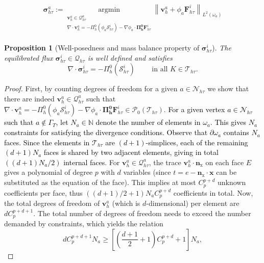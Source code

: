 \documentclass[10pt,a4paper]{amsart}
\newtheorem{proposition}{Proposition}
\def \Fhti {\bm{F}_\htt^i}
\def \Shti {\calS_\htt^i}
\def \calN {\mathcal{N}}
\def \calP {\mathcal{P}}
\def \calQ {\bm{\mathcal{Q}}}
\def \calS {\mathcal{S}}
\def \calT {\mathcal{T}}
\def \flx {\bm{\sigma}_{\htt}^i}
\def \flxa {\bm{\sigma}^a_{\htt}}
\def \htt {{h\tau}}
\def \nhat {\bm{n}_{\mathrm{x}}}
\def \oma {\omega_a}
\def \p  {\partial}
\def \x {{\bm{x}}}
\begin{document}
    \begin{align}\label{eq:optimization}
        \flxa:= \underset{\substack{\bm{v}^a_h\in\calQ_\htt^a\\
       \nabla\cdot \bm{v}^a_h = -\Pi_h^0 (\phi_a \Shti) - \nabla\phi_a \cdot \bm{\Pi_h^0} \Fhti}}{\mathrm{argmin}} \left\| \bm{v}^a_h + \phi_a \Fhti\right\|_{L^2(\oma)}
    \end{align}

\begin{proposition}[Well-posedness and mass balance property of $\flx$]\label{mass_balance_property}
    The equilibrated flux $\flx \in \calQ_\htt$ is well defined and satisfies 
    \[
    \nabla\cdot \flx= -\Pi_h^0(\Shti) \qquad \text{ in all } K\in \calT_\htt.
    \]
\end{proposition}

\begin{proof}
First, by counting degrees of freedom for a given $a\in \calN_\htt$ we show that there are indeed $\bm{v}_h^a\in \calQ_\htt^a $ such that $\nabla\cdot \bm{v}^a_h = -\Pi_h^0 (\phi_a \Shti) - \nabla\phi_a \cdot \bm{\Pi_h^0} \Fhti\in \calP_0(\calT_\htt)$. \textcolor{black}{For a given vertex $a \in \mathcal{N}_{h\tau}$ such that $a \notin \Gamma_T$, let $N_a \in \mathbb{N}$ denote the number of elements in $\omega_a$. This gives $N_a$ constraints for satisfying the divergence conditions. Observe that $\partial\omega_a$ contains $N_a$ faces. Since the elements in $\mathcal{T}_{h\tau}$ are $(d+1)$-simplices, each of the remaining $(d+1)N_a$ faces is shared by two adjacent elements, giving in total $((d+1)N_a/2)$ internal faces}. 
For $\bm{v}_h^a\in \calQ_\htt^a$, the trace $\bm{v}^a_h\cdot \nhat$ on each face $E$ gives a polynomial of degree $p$ with $d$ variables (since $t=e-\nhat\cdot \x$ can be substituted as the equation of the face). This implies at most $C_p^{p+d}$ unknown coefficients per  face, thus $((d+1)/2 +1) N_a C_p^{p+d}$ coefficients in total. Now, the total degrees of freedom of $\bm{v}_h^a$ (which is $d$-dimensional) per element are $dC^{p+d+1}_p$. The total number of degrees of freedom needs to exceed the number demanded by constraints, which yields the relation
\[
dC^{p+d+1}_p N_a \geq \left[\left(\frac{d+1}{2} +1\right) C_p^{p+d} + 1\right]N_a,
\]
\end{proof}
\end{document}
